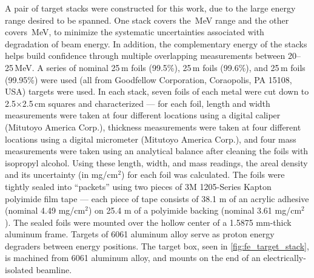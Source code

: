 A pair of target stacks were constructed for this work, due to the large energy range desired to be spanned.
One stack covers the \,MeV range and the other covers \,MeV, to minimize the systematic uncertainties associated with degradation of beam energy.
In addition, the complementary  energy  of the  stacks helps build confidence  through multiple overlapping measurements between 20--25\,MeV.  
A series of nominal 25\,\mmicro m  foils (99.5\%), 25\,\mmicro m  foils (99.6\%), and 25\,\mmicro m  foils (99.95\%) were used (all from Goodfellow Corporation, Coraopolis, PA 15108, USA) targets were used.
In each stack, seven foils of each metal were cut down to 2.5$\times$2.5\,cm squares and characterized --- for each foil, length and width measurements were taken at four different locations using a digital caliper (Mitutoyo America Corp.), thickness measurements were taken at four different locations using a digital micrometer (Mitutoyo America Corp.), and four mass measurements were taken using an analytical balance after cleaning the foils with isopropyl alcohol.
Using these length, width, and mass readings, the areal density and its uncertainty (in mg/cm$^2$) for each foil was calculated.
The foils were tightly sealed into \enquote{packets} using two pieces of  3M 1205-Series Kapton polyimide film tape --- each piece of tape consists of 38.1 \mmicro m of an acrylic adhesive (nominal 4.49 mg/cm$^2$) on 25.4 \mmicro m of a polyimide backing (nominal 3.61 mg/cm$^2$).
The sealed foils were mounted over the hollow center of a 1.5875 mm-thick aluminum frame.
Targets of 6061 aluminum alloy  serve as proton energy degraders  between energy positions.
The target box, seen in \autoref{fig:fe_target_stack}, is machined from 6061 aluminum alloy, and mounts on the end of an electrically-isolated beamline.
